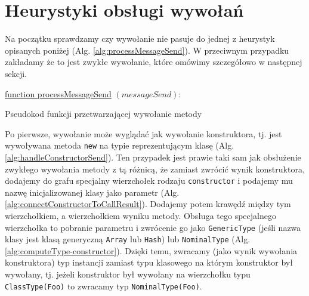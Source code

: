 \documentclass[shortabstract,mgr]{iithesis}
\newcommand{\algsize}{\small}
\begin{document}
\section{Heurystyki obsługi wywołań}

Na początku sprawdzamy czy wywołanie nie pasuje do jednej z heurystyk opisanych poniżej (Alg. \ref{alg:processMessageSend}). W przeciwnym przypadku zakładamy że to jest zwykłe wywołanie, które omówimy szczegółowo w następnej sekcji.

\begin{algorithm}
    \algsize
    \underline{function processMessageSend} $(\mathit{messageSend})$:\\
    \caption{Pseudokod funkcji przetwarzającej wywołanie metody}
    \label{alg:processMessageSend}
\end{algorithm}

Po pierwsze, wywołanie może wyglądać jak wywołanie konstruktora, tj. jest wywoływana metoda \texttt{new} na typie reprezentującym klasę (Alg. \ref{alg:handleConstructorSend}). Ten przypadek jest prawie taki sam jak obsłużenie zwykłego wywołania metody z tą różnicą, że zamiast zwrócić wynik konstruktora, dodajemy do grafu specjalny wierzchołek rodzaju \texttt{constructor} i podajemy mu nazwę inicjalizowanej klasy jako parametr (Alg. \ref{alg:connectConstructorToCallResult}). Dodajemy potem krawędź między tym wierzchołkiem, a wierzchołkiem wyniku metody. Obsługa tego specjalnego wierzchołka to pobranie parametru i zwrócenie go jako \texttt{GenericType} (jeśli nazwa klasy jest klasą generyczną \texttt{Array} lub \texttt{Hash}) lub \texttt{NominalType} (Alg. \ref{alg:computeType-constructor}). Dzięki temu, zwracamy (jako wynik wywołania konstruktora) typ instancji zamiast typu klasowego na którym konstruktor był wywołany, tj. jeżeli konstruktor był wywołany na wierzchołku typu \texttt{ClassType(Foo)} to zwracamy typ \texttt{NominalType(Foo)}.
\end{document}
